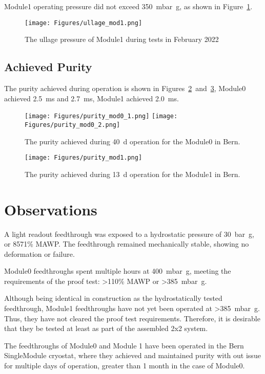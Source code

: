 \documentclass[a4paper]{article}
\begin{document}
Module1 operating pressure did not exceed \SI{350}{\milli\bar\g}, as shown in Figure~\ref{fig:ullage_mod1}.

\begin{figure}[htbp]
 	\centering
 	\texttt{[image: Figures/ullage\_mod1.png]}
 	\caption{The ullage pressure of Module1 during tests in February 2022}
 	\label{fig:ullage_mod1}
\end{figure}

\subsection{Achieved Purity}

The purity achieved during operation is shown in Figures~\ref{fig:puritymod0}~and~\ref{fig:puritymod1}, Module0 achieved \SI{2.5}{\milli\second} and \SI{2.7}{\milli\second}, Module1 achieved \SI{2.0}{\milli\second}.


\begin{figure}[htbp]
	\centering
	\texttt{[image: Figures/purity\_mod0\_1.png]}
	\texttt{[image: Figures/purity\_mod0\_2.png]}
	\caption{The purity achieved during \SI{40}{\day} operation for the Module0 in Bern.}
	\label{fig:puritymod0}
\end{figure}

\begin{figure}[htbp]
	\centering
	\texttt{[image: Figures/purity\_mod1.png]}
	\caption{The purity achieved during \SI{13}{\day} operation for the Module1 in Bern.}
	\label{fig:puritymod1}
\end{figure}



\section{Observations}
A light readout feedthrough was exposed to a hydrostatic pressure of \SI{30}{\bar\g}, or 8571\% MAWP. 
The feedthrough remained mechanically stable, showing no deformation or failure.

Module0 feedthroughs spent multiple hours at \SI{400}{\milli\bar\g}, meeting the requirements of the proof test: >110\% MAWP or >\SI{385}{\milli\bar\g}.

Although being identical in construction as the hydrostatically tested feedthrough, Module1 feedthroughs have not yet been operated at >\SI{385}{\milli\bar\g}. 
Thus, they have not cleared the proof test requirements.  
Therefore, it is desirable that they be tested at least as part of the assembled 2x2 system.  

The feedthroughs of Module0 and Module 1 have been operated in the Bern SingleModule cryostat, where they achieved and maintained purity with
out issue for multiple days of operation, greater than 1 month in the case of Module0.   

\printbibliography
\end{document}
